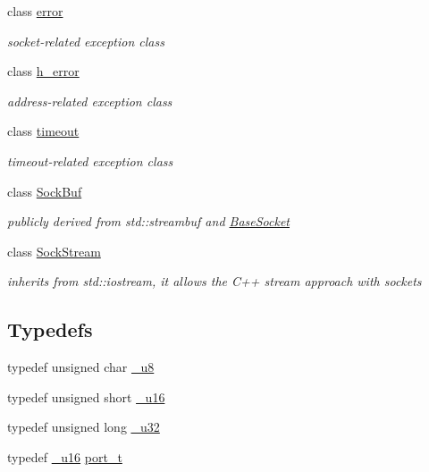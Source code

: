 \begin{CompactItemize}
class \hyperlink{classsocketpp_1_1error}{error}
\begin{CompactList}\small\item\em socket-related exception class \item\end{CompactList}\item 
class \hyperlink{classsocketpp_1_1h__error}{h\_\-error}
\begin{CompactList}\small\item\em address-related exception class \item\end{CompactList}\item 
class \hyperlink{classsocketpp_1_1timeout}{timeout}
\begin{CompactList}\small\item\em timeout-related exception class \item\end{CompactList}\item 
class \hyperlink{classsocketpp_1_1SockBuf}{SockBuf}
\begin{CompactList}\small\item\em publicly derived from std::streambuf and \hyperlink{classsocketpp_1_1BaseSocket}{BaseSocket} \item\end{CompactList}\item 
class \hyperlink{classsocketpp_1_1SockStream}{SockStream}
\begin{CompactList}\small\item\em inherits from std::iostream, it allows the C++ stream approach with sockets \item\end{CompactList}\end{CompactItemize}
\subsection*{Typedefs}
\begin{CompactItemize}
\item 
typedef unsigned char \hyperlink{namespacesocketpp_1398da7d8125cdb32e89041e5b0adb96}{\_\-u8}
\item 
typedef unsigned short \hyperlink{namespacesocketpp_0d48e817f00cbb84d07faec41ee4b169}{\_\-u16}
\item 
typedef unsigned long \hyperlink{namespacesocketpp_d9c3b2ad093bb5814af59760e0a2192a}{\_\-u32}
\item 
typedef \hyperlink{namespacesocketpp_0d48e817f00cbb84d07faec41ee4b169}{\_\-u16} \hyperlink{namespacesocketpp_5517ef80f249b891a2ba64b95fc1e723}{port\_\-t}
\end{CompactItemize}
